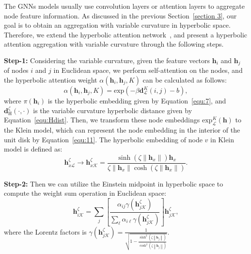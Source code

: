The GNNs models usually use convolution layers or attention layers to aggregate node feature information. 
As discussed in the previous Section~\ref{section 3}, our goal is to obtain an aggregation with variable curvature in hyperbolic space. 
Therefore, we extend the hyperbolic attention network~\cite{HAtt}, and present a hyperbolic attention aggregation with variable curvature through the following steps.

\textbf{Step-1: }
Considering the variable curvature, given the feature vectors $\mathbf{h}_i$ and $\mathbf{h}_j$ of nodes $i$ and $j$ in Euclidean space, we perform self-attention on the nodes, and the hyperbolic attention weight $\alpha\left(\mathbf{h}_{i}, \mathbf{h}_{j}, K \right)$ can be calculated as follows:
\begin{equation}
    \alpha\left(\mathbf{h}_{i}, \mathbf{h}_{j}, K \right)=\mathrm{exp}\left(-\beta \mathbf{d}^{K}_{\mathcal{L}}(i,j)-b\right),
\end{equation}
where $\pi(\mathbf{h}_{i})$ is the hyperbolic embedding given by Equation~\eqref{equ:7}, and $\mathbf{d}^{\zeta}_{\mathrm{H}}(\cdot,\cdot)$ is the variable curvature hyperbolic distance given by Equation~\eqref{equ:Hdist}. 
Then, we transform these node embeddings $\mathrm{exp}^{K}_{\mathcal{L}}(\mathbf{h})$ to the Klein model, which can represent the node embedding in the interior of the unit disk by Equation~\eqref{equ:11}. 
The hyperbolic embedding of node $v$  in Klein model is defined as:
\begin{equation}
    \mathbf{h}^{\zeta}_{x \mathcal{L}} \rightarrow \mathbf{h}_{x \mathcal{K}}^{\zeta} = \frac{\sinh(\zeta \left\|\mathbf{h}_x\right\|) \mathbf{h}_x}{\zeta \left\|\mathbf{h}_x\right\| \cosh(\zeta \left\|\mathbf{h}_x\right\|)}. 
\end{equation}

\textbf{Step-2:} Then we can utilize the Einstein midpoint in hyperbolic space to compute the weight sum operation in Euclidean space: 
\begin{equation}
    \mathbf{h}_{i \mathcal{K}}^{\zeta} = \sum_{j}\left[\frac{\alpha_{i j} \gamma\left(\mathbf{h}_{j \mathcal{K}}^{\zeta}\right)}{\sum_{\ell} \alpha_{i \ell} \gamma\left(\mathbf{h}_{j \mathcal{K}}^{\zeta}\right)}\right] \mathbf{h}_{j \mathcal{K}}^{\zeta},
\end{equation}
where the Lorentz factors is $\gamma(\mathbf{h}_{j \mathcal{K}}^{\zeta})=\frac{1}{\sqrt{1-  \frac{\sinh^2(\zeta  \left\|\mathbf{h}_j\right\|)}{\cosh^2(\zeta \left\|\mathbf{h}_j\right\|)}    } }$. 

